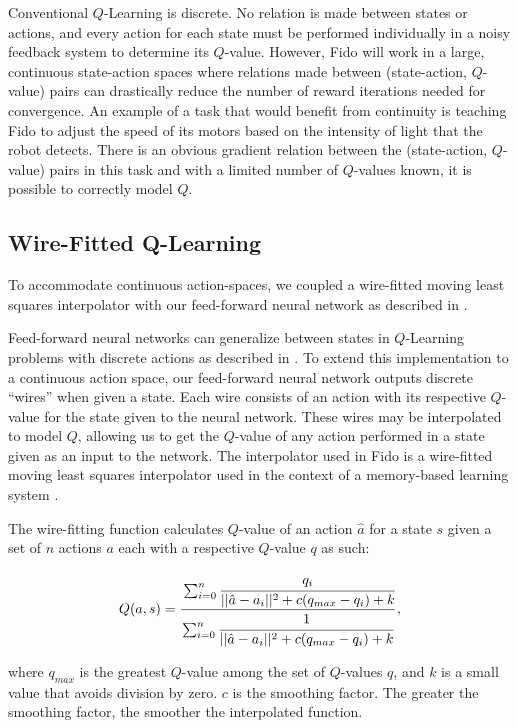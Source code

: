Conventional $Q$-Learning is discrete. No relation is made between states or actions, and every action for each state must be performed individually in a noisy feedback system to determine its $Q$-value. However, Fido will work in a large, continuous state-action spaces where relations made between (state-action, $Q$-value) pairs can drastically reduce the number of reward iterations needed for convergence. An example of a task that would benefit from continuity is teaching Fido to adjust the speed of its motors based on the intensity of light that the robot detects. There is an obvious gradient relation between the (state-action, $Q$-value) pairs in this task and with a limited number of $Q$-values known, it is possible to correctly model $Q$.

\subsection{Wire-Fitted Q-Learning}

To accommodate continuous action-spaces, we coupled a wire-fitted moving least squares interpolator with our feed-forward neural network as described in \cite{gaskett}.

Feed-forward neural networks can generalize between states in $Q$-Learning problems with discrete actions as described in \cite{rummery}. To extend this implementation to a continuous action space, our feed-forward neural network outputs discrete ``wires'' when given a state. Each wire consists of an action with its respective $Q$-value for the state given to the neural network. These wires may be interpolated to model $Q$, allowing us to get the $Q$-value of any action performed in a state given as an input to the network. The interpolator used in Fido is a wire-fitted moving least squares interpolator used in the context of a memory-based learning system \cite{baird}.

The wire-fitting function calculates $Q$-value of an action $\hat{a}$ for a state $s$ given a set of $n$ actions $a$ each with a respective $Q$-value $q$ as such:

\begin{equation}
	Q(a, s) = \cfrac{\sum_{i=0}^{n}\cfrac{q_i}{||\hat{a}-a_i||^2+c(q_{max}-q_i)+k}}{\sum_{i=0}^{n}\cfrac{1}{||\hat{a}-a_i||^2+c(q_{max}-q_i)+k}}
	\,,
\end{equation}

\noindent
where $q_{max}$ is the greatest $Q$-value among the set of $Q$-values $q$, and $k$ is a small value that avoids division by zero. $c$ is the smoothing factor. The greater the smoothing factor, the smoother the interpolated function.


